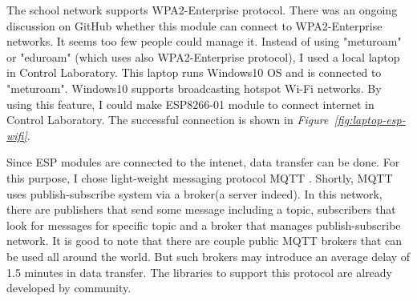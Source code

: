 \documentclass[a4paper,12pt]{article}
\begin{document}
The school network supports WPA2-Enterprise protocol. There was an ongoing discussion on GitHub \cite{ref-github-esp8266} whether this module can connect to WPA2-Enterprise networks. It seems too few people could manage it. Instead of using "meturoam" or "eduroam" (which uses also WPA2-Enterprise protocol), I used a local laptop in Control Laboratory. This laptop runs Windows10 OS and is connected to "meturoam". Windows10 supports broadcasting hotspot Wi-Fi networks. By using this feature, I could make ESP8266-01 module to connect internet in Control Laboratory. The successful connection is shown in \textit{Figure~\ref{fig:laptop-esp-wifi}}.

Since ESP modules are connected to the intenet, data transfer can be done. For this purpose, I chose light-weight messaging protocol MQTT \cite{ref-mqtt}. Shortly, MQTT uses publish-subscribe system via a broker(a server indeed). In this network, there are publishers that send some message including a topic, subscribers that look for messages for specific topic and a broker that manages publish-subscribe network. It is good to note that there are couple public MQTT brokers that can be used all around the world. But such brokers may introduce an average delay of 1.5 minutes in data transfer. The libraries to support this protocol are already developed by community.
\end{document}
